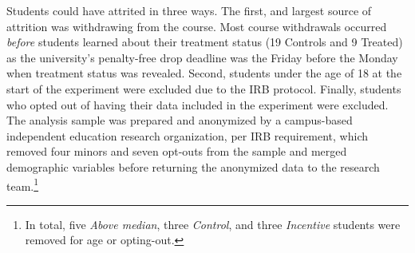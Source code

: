 \documentclass[12pt]{article}
\begin{document}
Students could have attrited in three ways.
The first, and largest source of attrition was withdrawing from the course.
Most course withdrawals occurred \textit{before} students learned about their treatment status (19 Controls and 9 Treated) as the university's penalty-free drop deadline was the Friday before the Monday when treatment status was revealed.
Second, students under the age of 18 at the start of the experiment were excluded due to the IRB protocol.
Finally, students who opted out of having their data included in the experiment were excluded.
The analysis sample was prepared and anonymized by a campus-based independent education research organization, per IRB requirement, which removed four minors and seven opt-outs from the sample and merged demographic variables before returning the anonymized data to the research team.\footnote{In total, five \textit{Above median}, three \textit{Control}, and three \textit{Incentive} students were removed for age or opting-out.}

\end{document}
